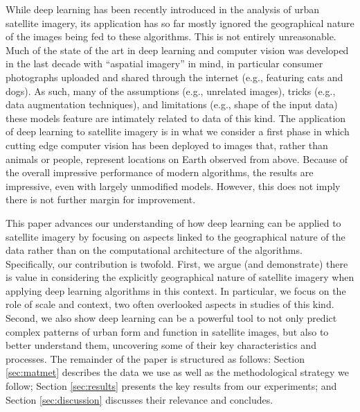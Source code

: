 
While deep learning has been recently introduced in the analysis of urban satellite
imagery, its application has so far mostly ignored the geographical nature of
the images being fed to these algorithms. This is not entirely unreasonable.
Much of the state of the art in deep learning and computer vision was
developed in the last decade with ``aspatial imagery'' in mind, in particular consumer
photographs uploaded and shared through the internet (e.g., featuring cats and
dogs). As such, many of the assumptions (e.g., unrelated images), tricks
(e.g., data augmentation techniques), and limitations (e.g., shape of the
input data) these models
feature are intimately related to data of this kind. The application of deep
learning to satellite imagery is in what we consider a first phase in which
cutting edge computer vision has been deployed to images that, rather than
animals or people, represent locations on Earth observed from above. Because
of the overall impressive performance of modern algorithms, the results are
impressive, even with largely unmodified models. However, this does not imply
there is not further margin for improvement.

This paper advances our understanding of how deep learning can be applied to
satellite imagery by focusing on aspects linked to the geographical nature of the
data rather than on the computational architecture of the algorithms.
Specifically, our contribution is twofold. First, we argue (and demonstrate)
there is value in considering the explicitly geographical nature of satellite
imagery when applying deep learning algorithms in this context.
In particular, we focus on the role of scale and context, two often overlooked
aspects in studies of this kind.
%
Second, we also show deep learning can be a powerful tool to not only predict
complex patterns of urban form and function in satellite images, but also to
better understand them, uncovering some of their key characteristics and
processes.
%
The remainder of the paper is structured as follows:
Section \ref{sec:matmet} describes the data we use as well as the
methodological strategy we follow;
Section \ref{sec:results} presents the key results from our experiments;
and Section \ref{sec:discussion} discusses their relevance and concludes.


